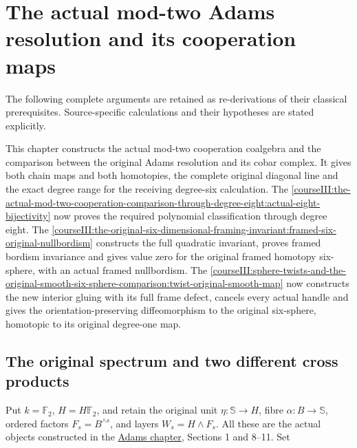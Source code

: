 \section{The actual mod-two Adams resolution and its cooperation maps}\label{courseIII:the-actual-mod-two-adams-resolution-and-cooperation-maps:section}

The following complete arguments are retained as re-derivations of their classical prerequisites. Source-specific calculations and their hypotheses are stated explicitly.

This chapter constructs the actual mod-two cooperation coalgebra and the comparison between the original Adams resolution and its cobar complex. It gives both chain maps and both homotopies, the complete original diagonal line and the exact degree range for the receiving degree-six calculation. The \cref{courseIII:the-actual-mod-two-cooperation-comparison-through-degree-eight:actual-eight-bijectivity} now proves the required polynomial classification through degree eight. The \cref{courseIII:the-original-six-dimensional-framing-invariant:framed-six-original-nullbordism} constructs the full quadratic invariant, proves framed bordism invariance and gives value zero for the original framed homotopy six-sphere, with an actual framed nullbordism. The \cref{courseIII:sphere-twists-and-the-original-smooth-six-sphere-comparison:twist-original-smooth-map} now constructs the new interior gluing with its full frame defect, cancels every actual handle and gives the orientation-preserving diffeomorphism to the original six-sphere, homotopic to its original degree-one map.

\subsection{The original spectrum and two different cross products}
\label{courseIII:the-actual-mod-two-adams-resolution-and-cooperation-maps:cooperation-original-factors}

\label{courseIII:the-actual-mod-two-adams-resolution-and-cooperation-maps:section-1}\label{courseIII:actual-resolution:1}

Put \(k=\mathbb F_2\), \(H=H\mathbb F_2\), and retain the original unit \(\eta:\mathbb S\to H\), fibre \(\alpha:B\to\mathbb S\), ordered factors \(F_s=B^{\wedge s}\), and layers \(W_s=H\wedge F_s\). All these are the actual objects constructed in the \href{https://github.com/KokunoYumeto/open-math-courses/blob/90d11e68827abca7e732dc3e6c343a26c4c82ba4/docs/courses/CG-S6/src/the-adams-tower-and-exact-inverse-limits.md}{Adams chapter}, Sections 1 and 8--11. Set

